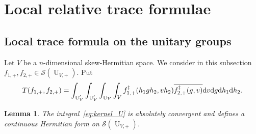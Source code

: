 \documentclass[letterpaper,11pt]{amsart}
\newcommand{\cS}{\mathcal{S}}
\newcommand{\rd}{\mathrm{d}}
\newcommand{\<}{\negthickspace}
\DeclareMathOperator{\U}{U}
\theoremstyle{definition}
\theoremstyle{plain}
\newtheorem{lemma}[definition]{Lemma}
\theoremstyle{remark}
\numberwithin{equation}{section}
\begin{document}
\section{Local relative trace formulae}


\subsection{Local trace formula on the unitary groups}
Let $V$ be a $n$-dimensional skew-Hermitian space. We consider in this
subsection $f_{1, +}, f_{2, +} \in \cS(\U_{V, +})$. Put
    \begin{equation}    \label{eq:kernel_U}
    T(f_{1, +}, f_{2, +})\\
    = \int_{\U_V'} \int_{\U_V'} \int_{\U_V} \int_{V}
    f_{1, +}^\ddag(h_1g h_2, vh_2) \overline{f_{2, +}^\ddag(g, v)}
    \rd v \rd g \rd h_1 \rd h_2.
    \end{equation}


\begin{lemma}   \label{lemma:kernel_convergence}
The integral~\eqref{eq:kernel_U} is absolutely convergent and defines a
continuous Hermitian form on $\cS(\U_{V,+})$.
\end{lemma}
\end{document}
